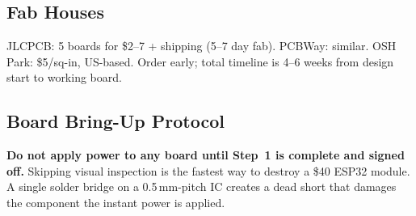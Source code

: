 \documentclass[11pt,letterpaper,twoside,openany]{book}
\begin{document}
\subsection{Fab Houses}
JLCPCB: 5 boards for \$2--7 + shipping (5--7 day fab). PCBWay: similar. OSH Park: \$5/sq-in, US-based. Order early; total timeline is 4--6 weeks from design start to working board.

\subsection{Board Bring-Up Protocol}

\begin{warningbox}
\textbf{Do not apply power to any board until Step~1 is complete and signed off.} Skipping visual inspection is the fastest way to destroy a \$40 ESP32 module. A single solder bridge on a 0.5\,mm-pitch IC creates a dead short that damages the component the instant power is applied.
\end{warningbox}
\end{document}
